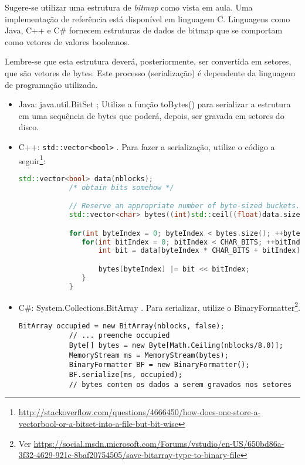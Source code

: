 \documentclass[a4paper, oneside,12pt]{article}
\begin{document}
Sugere-se utilizar uma estrutura de \emph{bitmap} como vista em aula. Uma implementação de referência está disponível em linguagem C. Linguagens como Java, C++ e C\# fornecem estruturas de dados de bitmap que se comportam como vetores de valores booleanos.

Lembre-se que esta estrutura deverá, posteriormente, ser convertida em setores, que são vetores de bytes. Este processo (serialização) é dependente da linguagem de programação utilizada.

\begin{itemize}
    \item Java: java.util.BitSet ; Utilize a função toBytes() para serializar a estrutura em uma sequência de bytes que poderá, depois, ser gravada em setores do disco.

    \item C++: {\tt std::vector<bool>} . Para fazer a serialização, utilize o código a seguir\footnote{\url{http://stackoverflow.com/questions/4666450/how-does-one-store-a-vectorbool-or-a-bitset-into-a-file-but-bit-wise}}:
        \begin{lstlisting}[language=C++]
            std::vector<bool> data(nblocks);
            /* obtain bits somehow */

            // Reserve an appropriate number of byte-sized buckets.
            std::vector<char> bytes((int)std::ceil((float)data.size() / CHAR_BITS));

            for(int byteIndex = 0; byteIndex < bytes.size(); ++byteIndex) {
               for(int bitIndex = 0; bitIndex < CHAR_BITS; ++bitIndex) {
                   int bit = data[byteIndex * CHAR_BITS + bitIndex];

                   bytes[byteIndex] |= bit << bitIndex;
               }
            }
        \end{lstlisting}

    \item C\#: System.Collections.BitArray . Para serializar, utilize o BinaryFormatter\footnote{Ver \url{https://social.msdn.microsoft.com/Forums/vstudio/en-US/650bd86a-3f32-4629-921c-8baf20754505/save-bitarray-type-to-binary-file}}.

        \begin{lstlisting}[language={[Sharp]C}, showspaces=false ]
            BitArray occupied = new BitArray(nblocks, false);
            // ... preenche occupied
            Byte[] bytes = new Byte[Math.Ceiling(nblocks/8.0)];
            MemoryStream ms = MemoryStream(bytes);
            BinaryFormatter BF = new BinaryFormatter();
            BF.serialize(ms, occupied);
            // bytes contem os dados a serem gravados nos setores
        \end{lstlisting}

\end{itemize}
\end{document}
